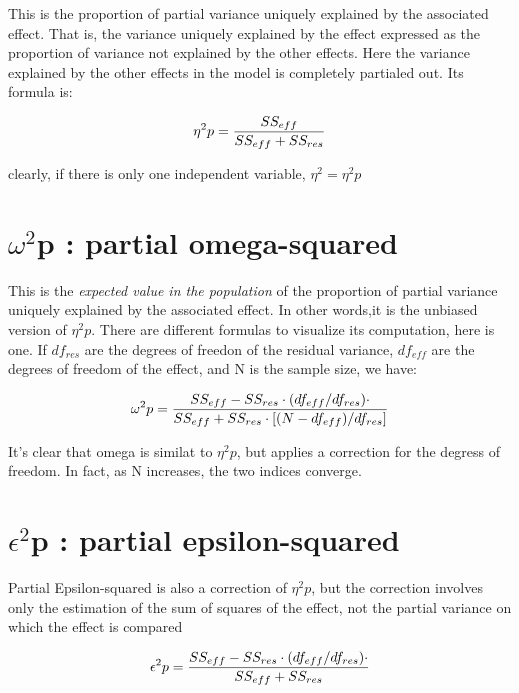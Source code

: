 \documentclass[]{article}
\begin{document}
This is the proportion of partial variance uniquely explained by the
associated effect. That is, the variance uniquely explained by the
effect expressed as the proportion of variance not explained by the
other effects. Here the variance explained by the other effects in the
model is completely partialed out. Its formula is:

\[\eta^2p={{SS_{eff} \over {SS_{eff}+SS_{res}}}}\]

clearly, if there is only one independent variable, \(\eta^2=\eta^2p\)

\hypertarget{omega2p-partial-omega-squared}{%
\section{\texorpdfstring{\(\omega^2\)p : partial
omega-squared}{\textbackslash{}omega\^{}2p : partial omega-squared}}\label{omega2p-partial-omega-squared}}

This is the \emph{expected value in the population} of the proportion of
partial variance uniquely explained by the associated effect. In other
words,it is the unbiased version of \(\eta^2p\). There are different
formulas to visualize its computation, here is one. If \(df_{res}\) are
the degrees of freedon of the residual variance, \(df_{eff}\) are the
degrees of freedom of the effect, and N is the sample size, we have:

\[\omega^2p={{SS_{eff}-SS_{res} \cdot ({df_{eff}/df_{res}) \cdot }}\over{ SS_{eff}+SS_{res} \cdot [({N-df_{eff})/df_{res}}]
}}\]

It's clear that omega is similat to \(\eta^2p\), but applies a
correction for the degress of freedom. In fact, as N increases, the two
indices converge.

\hypertarget{epsilon2p-partial-epsilon-squared}{%
\section{\texorpdfstring{\(\epsilon^2\)p : partial
epsilon-squared}{\textbackslash{}epsilon\^{}2p : partial epsilon-squared}}\label{epsilon2p-partial-epsilon-squared}}

Partial Epsilon-squared is also a correction of \(\eta^2p\), but the
correction involves only the estimation of the sum of squares of the
effect, not the partial variance on which the effect is compared

\[\epsilon^2p={{SS_{eff}-SS_{res} \cdot ({df_{eff}/df_{res}) \cdot }}\over{ SS_{eff}+SS_{res}}}\]
\end{document}
